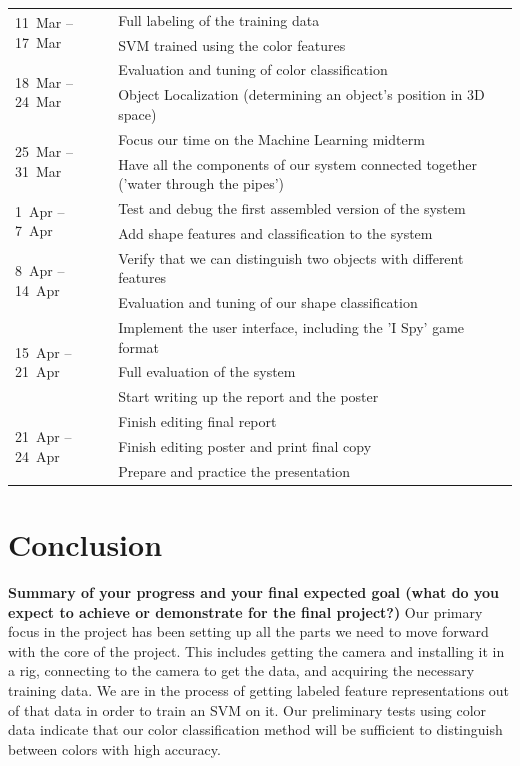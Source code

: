 \documentclass[11pt]{article}
\newcommand{\xxx}[1]{{\bf \color{red} #1}}
\newcommand\T{\rule{0pt}{3ex}}
\newcommand\B{\rule[-1.2ex]{0pt}{0pt}}
\begin{document}
\begin{center}
    \begin{tabular}{ | l | l |}
    \hline
    \multirow{2}{*}{11~Mar -- 17~Mar} 
	& Full labeling of the training data \T \\
	& SVM trained using the color features \B \\ 
    \hline
    \multirow{2}{*}{18~Mar -- 24~Mar} 
	& Evaluation and tuning of color classification \T \\ 
	& Object Localization (determining an object's position in 3D space) \B \\ 
    \hline
    \multirow{2}{*}{25~Mar -- 31~Mar} 
	& Focus our time on the Machine Learning midterm \T\\
	& Have all the components of our system connected together ('water through the pipes') \B \\ 
    \hline
    \multirow{2}{*}{1~Apr -- 7~Apr} 
	& Test and debug the first assembled version of the system \T \\
	& Add shape features and classification to the system \B\\ 
    \hline
    \multirow{2}{*}{8~Apr -- 14~Apr} 
	& Verify that we can distinguish two objects with different features \T\\
	& Evaluation and tuning of our shape classification \B \\ 
    \hline
    \multirow{3}{*}{15~Apr -- 21~Apr} 
	& Implement the user interface, including the 'I Spy' game format \T\\
	& Full evaluation of the system \\ 
	& Start writing up the report and the poster \B \\
    \hline
    \multirow{3}{*}{21~Apr -- 24~Apr} 
	& Finish editing final report \T \\
	& Finish editing poster and print final copy \\ 
	& Prepare and practice the presentation \B \\
    \hline
    \end{tabular}
\end{center}

\section{Conclusion}
\xxx{Summary of your progress and your final expected goal (what do you expect
    to achieve or demonstrate for the final project?)}
Our primary focus in the project has been setting up all the parts we need to move forward with the core of the project. This includes getting the camera and installing it in a rig, connecting to the camera to get the data, and acquiring the necessary training data. We are in the process of getting labeled feature representations out of that data in order to train an SVM on it. Our preliminary tests using color data indicate that our color classification method will be sufficient to distinguish between colors with high accuracy.
\end{document}
